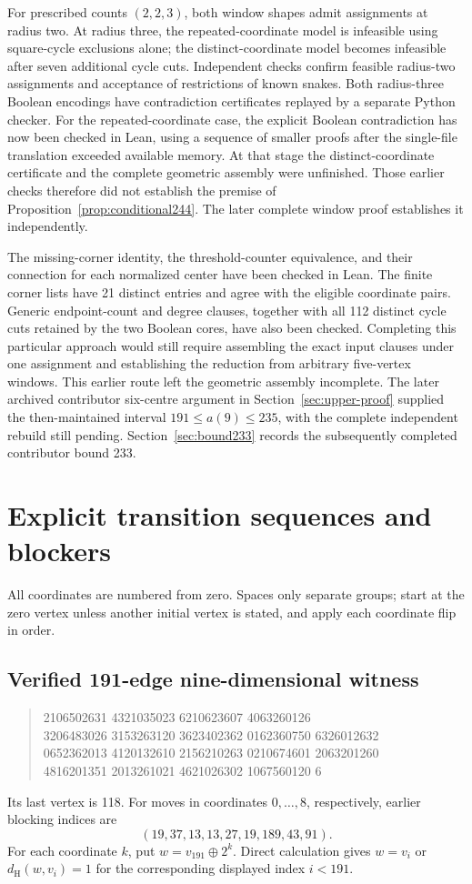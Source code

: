 \documentclass[11pt,a4paper]{article}
\theoremstyle{definition}
\theoremstyle{remark}
\newcommand{\Ham}{d_{\mathrm H}}
\begin{document}
For prescribed counts $(2,2,3)$, both window shapes admit assignments at radius two. At radius three, the repeated-coordinate model is infeasible using square-cycle exclusions alone; the distinct-coordinate model becomes infeasible after seven additional cycle cuts. Independent checks confirm feasible radius-two assignments and acceptance of restrictions of known snakes. Both radius-three Boolean encodings have contradiction certificates replayed by a separate Python checker. For the repeated-coordinate case, the explicit Boolean contradiction has now been checked in Lean, using a sequence of smaller proofs after the single-file translation exceeded available memory. At that stage the distinct-coordinate certificate and the complete geometric assembly were unfinished. Those earlier checks therefore did not establish the premise of Proposition~\ref{prop:conditional244}. The later complete window proof establishes it independently.

The missing-corner identity, the threshold-counter equivalence, and their connection for each normalized center have been checked in Lean. The finite corner lists have 21 distinct entries and agree with the eligible coordinate pairs. Generic endpoint-count and degree clauses, together with all 112 distinct cycle cuts retained by the two Boolean cores, have also been checked. Completing this particular approach would still require assembling the exact input clauses under one assignment and establishing the reduction from arbitrary five-vertex windows. This earlier route left the geometric assembly incomplete. The later archived contributor six-centre argument in Section~\ref{sec:upper-proof} supplied the then-maintained interval $191\le a(9)\le235$, with the complete independent rebuild still pending. Section~\ref{sec:bound233} records the subsequently completed contributor bound 233.

\section{Explicit transition sequences and blockers}\label{app:witness}
All coordinates are numbered from zero. Spaces only separate groups; start at the zero vertex unless another initial vertex is stated, and apply each coordinate flip in order.
\subsection{Verified 191-edge nine-dimensional witness}
\begin{quote}\small{} 2106502631 4321035023 6210623607 4063260126\\
3206483026 3153263120 3623402362 0162360750 6326012632\\
0652362013 4120132610 2156210263 0210674601 2063201260\\
4816201351 2013261021 4621026302 1067560120 6
\end{quote}
Its last vertex is 118. For moves in coordinates $0,\ldots,8$, respectively, earlier blocking indices are
\[
(19,37,13,13,27,19,189,43,91).
\]
For each coordinate $k$, put $w=v_{191}\mathbin{\oplus}2^k$. Direct calculation gives $w=v_i$ or $\Ham(w,v_i)=1$ for the corresponding displayed index $i<191$.
\end{document}
